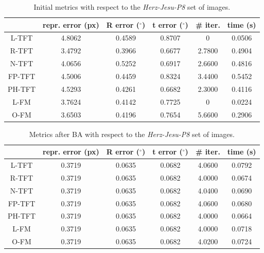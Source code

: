 \begin{table}[htbp]
  \centering
  \caption[\textit{Herz-Jesu-P8} Initial Metrics]{Initial metrics with respect to the \textit{Herz-Jesu-P8} set of images.}
  \label{tab:HerzJesuInit}
  \begin{tabular}{|*{6}{c}|}
    \hline
     & repr. error (px) & R error ($^{\circ}$) & t error ($^{\circ}$) & \# iter. & time (s)\\
    \hline
    \acs{L-TFT} & 4.8062 & 0.4589 & 0.8707 & 0 & 0.0506 \\
    \acs{R-TFT} & 3.4792 & 0.3966 & 0.6677 & 2.7800 & 0.4904 \\
    \acs{N-TFT} & 4.0656 & 0.5252 & 0.6917 & 2.6600 & 0.4816 \\
    \acs{FP-TFT} & 4.5006 & 0.4459 & 0.8324 & 3.4400 & 0.5452 \\
    \acs{PH-TFT} & 4.5293 & 0.4261 & 0.6682 & 2.3000 & 0.4116 \\
    \acs{L-FM} & 3.7624 & 0.4142 & 0.7725 & 0 & 0.0224 \\
    \acs{O-FM} & 3.6503 & 0.4196 & 0.7654 & 5.6600 & 0.2906 \\
    \hline
  \end{tabular}
\end{table}

\begin{table}[htbp]
  \centering
  \caption[\textit{Herz-Jesu-P8} Metrics with \acs{BA}]{Metrics after \acs{BA} with respect to the \textit{Herz-Jesu-P8} set of images.}
  \label{tab:HerzJesuBA}
  \begin{tabular}{|*{6}{c}|}
    \hline
     & repr. error (px) & R error ($^{\circ}$) & t error ($^{\circ}$) & \# iter. & time (s)\\
    \hline
    \acs{L-TFT} & 0.3719 & 0.0635 & 0.0682 & 4.0600 & 0.0792 \\
    \acs{R-TFT} & 0.3719 & 0.0635 & 0.0682 & 4.0000 & 0.0674 \\
    \acs{N-TFT} & 0.3719 & 0.0635 & 0.0682 & 4.0400 & 0.0690 \\
    \acs{FP-TFT} & 0.3719 & 0.0635 & 0.0682 & 4.0600 & 0.0680 \\
    \acs{PH-TFT} & 0.3719 & 0.0635 & 0.0682 & 4.0000 & 0.0664 \\
    \acs{L-FM} & 0.3719 & 0.0635 & 0.0682 & 4.0000 & 0.0718 \\
    \acs{O-FM} & 0.3719 & 0.0635 & 0.0682 & 4.0200 & 0.0724 \\
    \hline
  \end{tabular}
\end{table}


